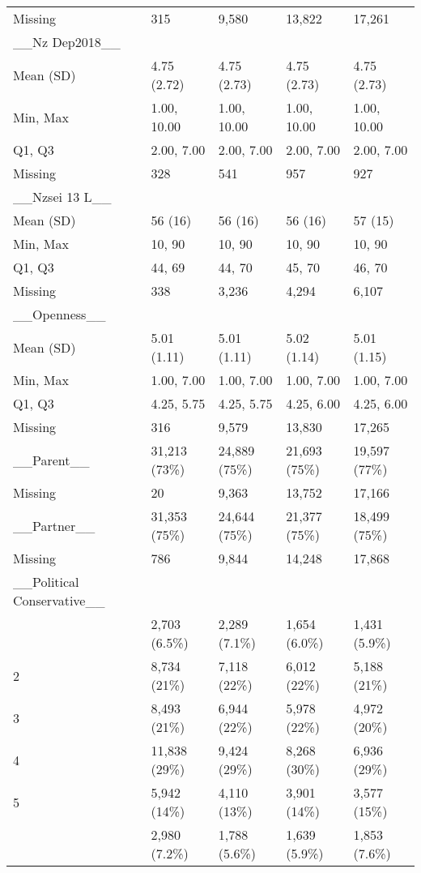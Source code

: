 \documentclass[
  single column]{article}
\begin{document}
\begin{longtable}[t]{lllll}
Missing & 315 & 9,580 & 13,822 & 17,261\\
\addlinespace
\_\_Nz Dep2018\_\_ &   ~~&   ~~&   ~~&   ~~\\
Mean (SD) & 4.75 (2.72) & 4.75 (2.73) & 4.75 (2.73) & 4.75 (2.73)\\
Min, Max & 1.00, 10.00 & 1.00, 10.00 & 1.00, 10.00 & 1.00, 10.00\\
Q1, Q3 & 2.00, 7.00 & 2.00, 7.00 & 2.00, 7.00 & 2.00, 7.00\\
Missing & 328 & 541 & 957 & 927\\
\addlinespace
\_\_Nzsei 13 L\_\_ &   ~~&   ~~&   ~~&   ~~\\
Mean (SD) & 56 (16) & 56 (16) & 56 (16) & 57 (15)\\
Min, Max & 10, 90 & 10, 90 & 10, 90 & 10, 90\\
Q1, Q3 & 44, 69 & 44, 70 & 45, 70 & 46, 70\\
Missing & 338 & 3,236 & 4,294 & 6,107\\
\addlinespace
\_\_Openness\_\_ &   ~~&   ~~&   ~~&   ~~\\
Mean (SD) & 5.01 (1.11) & 5.01 (1.11) & 5.02 (1.14) & 5.01 (1.15)\\
Min, Max & 1.00, 7.00 & 1.00, 7.00 & 1.00, 7.00 & 1.00, 7.00\\
Q1, Q3 & 4.25, 5.75 & 4.25, 5.75 & 4.25, 6.00 & 4.25, 6.00\\
Missing & 316 & 9,579 & 13,830 & 17,265\\
\addlinespace
\_\_Parent\_\_ & 31,213 (73\%) & 24,889 (75\%) & 21,693 (75\%) & 19,597 (77\%)\\
Missing & 20 & 9,363 & 13,752 & 17,166\\
\_\_Partner\_\_ & 31,353 (75\%) & 24,644 (75\%) & 21,377 (75\%) & 18,499 (75\%)\\
Missing & 786 & 9,844 & 14,248 & 17,868\\
\_\_Political Conservative\_\_ &   ~~&   ~~&   ~~&   ~~\\
\addlinespace
1 & 2,703 (6.5\%) & 2,289 (7.1\%) & 1,654 (6.0\%) & 1,431 (5.9\%)\\
2 & 8,734 (21\%) & 7,118 (22\%) & 6,012 (22\%) & 5,188 (21\%)\\
3 & 8,493 (21\%) & 6,944 (22\%) & 5,978 (22\%) & 4,972 (20\%)\\
4 & 11,838 (29\%) & 9,424 (29\%) & 8,268 (30\%) & 6,936 (29\%)\\
5 & 5,942 (14\%) & 4,110 (13\%) & 3,901 (14\%) & 3,577 (15\%)\\
\addlinespace
6 & 2,980 (7.2\%) & 1,788 (5.6\%) & 1,639 (5.9\%) & 1,853 (7.6\%)\\

\end{longtable}
\end{document}
